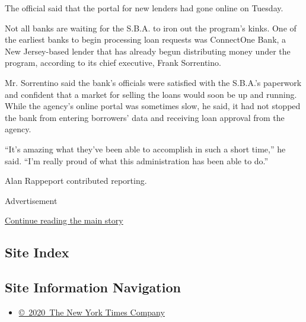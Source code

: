 The official said that the portal for new lenders had gone online on
Tuesday.

Not all banks are waiting for the S.B.A. to iron out the program's
kinks. One of the earliest banks to begin processing loan requests was
ConnectOne Bank, a New Jersey-based lender that has already begun
distributing money under the program, according to its chief executive,
Frank Sorrentino.

Mr. Sorrentino said the bank's officials were satisfied with the
S.B.A.'s paperwork and confident that a market for selling the loans
would soon be up and running. While the agency's online portal was
sometimes slow, he said, it had not stopped the bank from entering
borrowers' data and receiving loan approval from the agency.

``It's amazing what they've been able to accomplish in such a short
time,'' he said. ``I'm really proud of what this administration has been
able to do.''

Alan Rappeport contributed reporting.

Advertisement

\protect\hyperlink{after-bottom}{Continue reading the main story}

\hypertarget{site-index}{%
\subsection{Site Index}\label{site-index}}

\hypertarget{site-information-navigation}{%
\subsection{Site Information
Navigation}\label{site-information-navigation}}

\begin{itemize}
\tightlist
\item
  \href{https://help.nytimes.com/hc/en-us/articles/115014792127-Copyright-notice}{©~2020~The
  New York Times Company}
\end{itemize}

